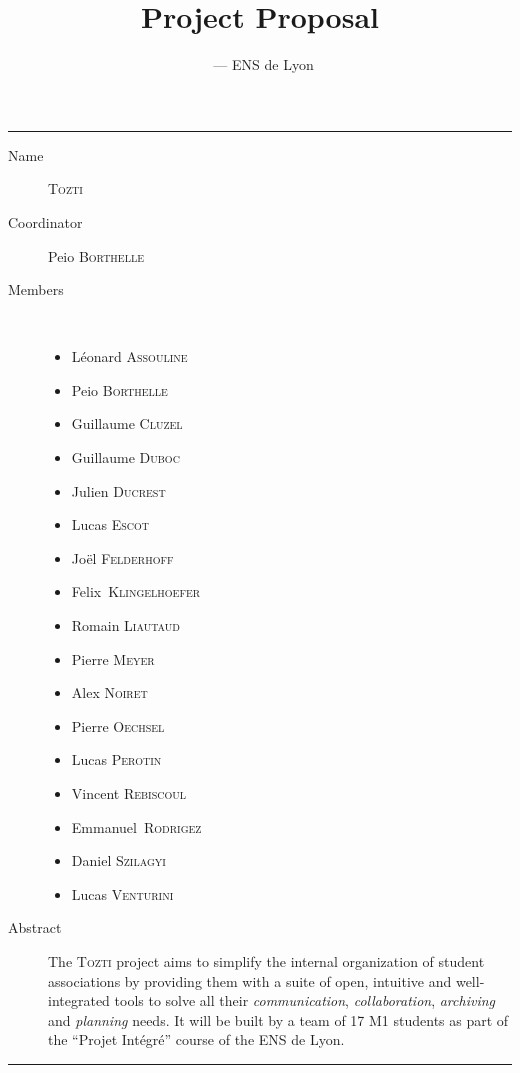 \documentclass[a4paper, 12pt]{article}
\title{\vspace{-3em}Project Proposal}
\author{\TOZTI\ --- ENS de Lyon}
\newcommand{\TOZTI}{\textsc{Tozti}\xspace}
\begin{document}
\maketitle

\vspace{2em}

\begin{center}
\begin{minipage}{.88\textwidth}
\centering
\rule{\textwidth}{1pt}
\begin{description}
  \item[Name] \TOZTI
  \item[Coordinator] Peio \textsc{Borthelle}
  \item[Members] ~\\
    \begin{multicols}{2}
      \begin{itemize}[label={\small\raisebox{.2ex}{\textbullet}}]
\item Léonard \textsc{Assouline}
\item Peio \textsc{Borthelle}
\item Guillaume \textsc{Cluzel}
\item Guillaume \textsc{Duboc}
\item Julien \textsc{Ducrest}
\item Lucas \textsc{Escot}
\item Joël \textsc{Felderhoff}
\item \mbox{Felix \textsc{Klingelhoefer}}
\item Romain \textsc{Liautaud}
\item Pierre \textsc{Meyer}
\item Alex \textsc{Noiret}
\item Pierre \textsc{Oechsel}
\item Lucas \textsc{Perotin}
\item Vincent \textsc{Rebiscoul}
\item \mbox{Emmanuel \textsc{Rodrigez}}
\item Daniel \textsc{Szilagyi}
\item Lucas \textsc{Venturini}
      \end{itemize}
    \end{multicols}
   \item[Abstract] The \TOZTI project aims to simplify the internal organization of student associations by providing them with a suite of open, intuitive and well-integrated tools to solve all their \textit{communication}, \textit{collaboration}, \textit{archiving} and \textit{planning} needs. It will be built by a team of 17 M1 students as part of the ``Projet Intégré'' course of the ENS de Lyon.
   \end{description}
  \rule{\textwidth}{1pt}
\end{minipage}
\end{center}
\end{document}
